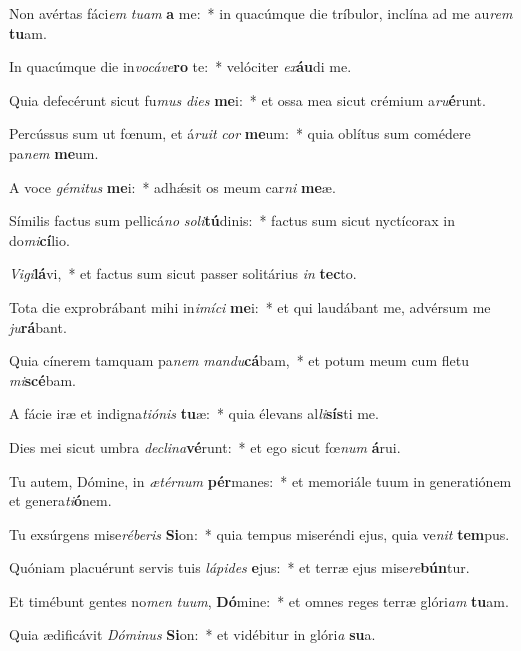 \item Non avértas fáci\textit{em} \textit{tu}\textit{am} \textbf{a} me:~* in quacúmque die tríbulor, inclína ad me au\textit{rem} \textbf{tu}am.
\item In quacúmque die in\textit{vo}\textit{cá}\textit{ve}\textbf{ro} te:~* velóciter \textit{ex}\textbf{áu}di me.
\item Quia defecérunt sicut fu\textit{mus} \textit{di}\textit{es} \textbf{me}i:~* et ossa mea sicut crémium a\textit{ru}\textbf{é}runt.
\item Percússus sum ut fœnum, et á\textit{ru}\textit{it} \textit{cor} \textbf{me}um:~* quia oblítus sum comédere pa\textit{nem} \textbf{me}um.
\item A voce \textit{gé}\textit{mi}\textit{tus} \textbf{me}i:~* adhǽsit os meum car\textit{ni} \textbf{me}æ.
\item Símilis factus sum pellicá\textit{no} \textit{so}\textit{li}\textbf{tú}dinis:~* factus sum sicut nyctícorax in do\textit{mi}\textbf{cí}lio.
\item \textit{Vi}\textit{gi}\textbf{lá}vi,~* et factus sum sicut passer solitárius \textit{in} \textbf{tec}to.
\item Tota die exprobrábant mihi in\textit{i}\textit{mí}\textit{ci} \textbf{me}i:~* et qui laudábant me, advérsum me \textit{ju}\textbf{rá}bant.
\item Quia cínerem tamquam pa\textit{nem} \textit{man}\textit{du}\textbf{cá}bam,~* et potum meum cum fletu \textit{mi}\textbf{scé}bam.
\item A fácie iræ et indigna\textit{ti}\textit{ó}\textit{nis} \textbf{tu}æ:~* quia élevans al\textit{li}\textbf{sís}ti me.
\item Dies mei sicut umbra \textit{de}\textit{cli}\textit{na}\textbf{vé}runt:~* et ego sicut fœ\textit{num} \textbf{á}rui.
\item Tu autem, Dómine, in \textit{æ}\textit{tér}\textit{num} \textbf{pér}manes:~* et memoriále tuum in generatiónem et genera\textit{ti}\textbf{ó}nem.
\item Tu exsúrgens mise\textit{ré}\textit{be}\textit{ris} \textbf{Si}on:~* quia tempus miseréndi ejus, quia ve\textit{nit} \textbf{tem}pus.
\item Quóniam placuérunt servis tuis \textit{lá}\textit{pi}\textit{des} \textbf{e}jus:~* et terræ ejus mise\textit{re}\textbf{bún}tur.
\item Et timébunt gentes no\textit{men} \textit{tu}\textit{um}, \textbf{Dó}mine:~* et omnes reges terræ glóri\textit{am} \textbf{tu}am.
\item Quia ædificávit \textit{Dó}\textit{mi}\textit{nus} \textbf{Si}on:~* et vidébitur in glóri\textit{a} \textbf{su}a.
